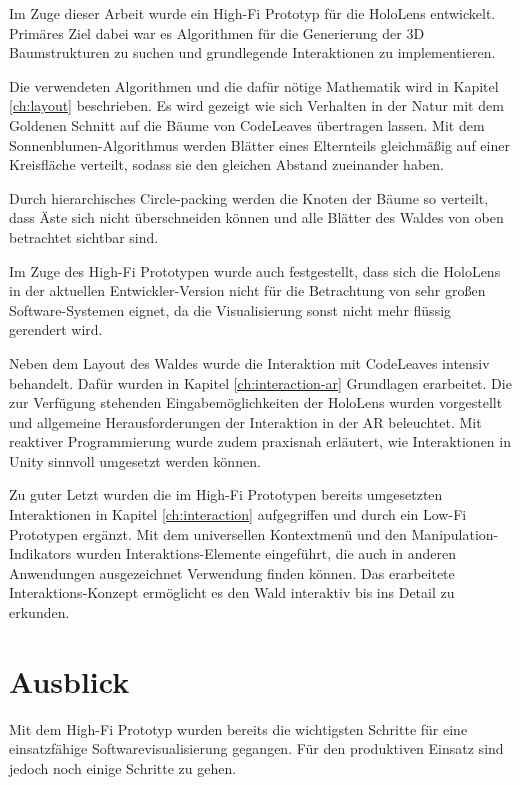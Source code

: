Im Zuge dieser Arbeit wurde ein High-Fi Prototyp für die HoloLens entwickelt. Primäres Ziel dabei war es Algorithmen für die Generierung der 3D Baumstrukturen zu suchen und grundlegende Interaktionen zu implementieren.

Die verwendeten Algorithmen und die dafür nötige Mathematik wird in Kapitel \ref{ch:layout} beschrieben. Es wird gezeigt wie sich Verhalten in der Natur mit dem Goldenen Schnitt auf die Bäume von CodeLeaves übertragen lassen. Mit dem Sonnenblumen-Algorithmus werden Blätter eines Elternteils gleichmäßig auf einer Kreisfläche verteilt, sodass sie den gleichen Abstand zueinander haben.

Durch hierarchisches Circle-packing werden die Knoten der Bäume so verteilt, dass Äste sich nicht überschneiden können und alle Blätter des Waldes von oben betrachtet sichtbar sind.

Im Zuge des High-Fi Prototypen wurde auch festgestellt, dass sich die HoloLens in der aktuellen Entwickler-Version nicht für die Betrachtung von sehr großen Software-Systemen eignet, da die Visualisierung sonst nicht mehr flüssig gerendert wird.

Neben dem Layout des Waldes wurde die Interaktion mit CodeLeaves intensiv behandelt. Dafür wurden in Kapitel \ref{ch:interaction-ar} Grundlagen erarbeitet. Die zur Verfügung stehenden Eingabemöglichkeiten der HoloLens wurden vorgestellt und allgemeine Herausforderungen der Interaktion in der AR beleuchtet. Mit reaktiver Programmierung wurde zudem praxisnah erläutert, wie Interaktionen in Unity sinnvoll umgesetzt werden können.

Zu guter Letzt wurden die im High-Fi Prototypen bereits umgesetzten Interaktionen in Kapitel \ref{ch:interaction} aufgegriffen und durch ein Low-Fi Prototypen ergänzt. Mit dem universellen Kontextmenü und den Manipulation-Indikators wurden Interaktions-Elemente eingeführt, die auch in anderen Anwendungen ausgezeichnet Verwendung finden können. Das erarbeitete Interaktions-Konzept ermöglicht es den Wald interaktiv bis ins Detail zu erkunden.

\section{Ausblick}

Mit dem High-Fi Prototyp wurden bereits die wichtigsten Schritte für eine einsatzfähige Softwarevisualisierung gegangen. Für den produktiven Einsatz sind jedoch noch einige Schritte zu gehen.

